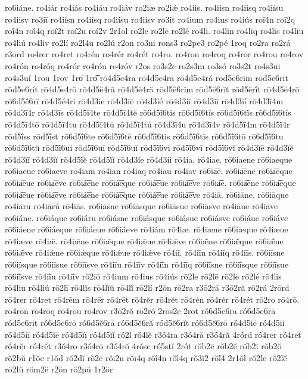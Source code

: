 {ro6iáne.
ro4iár
ro4iás
ro4iáu
ro4iáv
ro2iæ
ro2iǽ
ro4iis.
ro4iisn
ro4iisq
ro4iisu
ro4iisv
ro3iī
ro4iísn
ro4iísq
ro4iísu
ro4iísv
ro3it
ro4ium
ro4ius
ro4iús
roī4n
roī2q
roī́4n
roī́4q
roí2t
roí2u
roí2v
2r1ol
ro2le
ro2lē
ro2lé
ro4li.
ro4lin
ro4liq
ro4lis
ro4liu
ro4liú
ro4liv
ro2lí
ro2l4u
ro2lú
r2on
ro3ni
rons3
ro2pe3
ro2pé
1roq
ro2ra
ro2rá
r3ord
ro4rer
ro4ret
ro4rén
ro4rér
ro4rét
ro4ro.
ro4ron
ro4roq
ro4ror
ro4rou
ro4rov
ro4rón
ro4róq
ro4rór
ro4róu
ro4róv
r2os
ro3s2c
ro2s3m
ro3só
ro3s2t
ro4s3ui
ro4s3uí
1rou
1rov
1ro͞
1ro͡
rō4d5e4ra
rō4d5e4rā
rō4d5e4rá
rōd5e6rim
rōd5e6rit
rōd5e6rít
rō4d5e4rō
rō4d5ĕ4rā
rō4d5ĕ4ră
rōd5ĕ6rĭm
rōd5ĕ6rĭt
rōd5ĕrĭ́t
rō4d5ĕ4rō
rō6d5ĕ́6rĭ
rō4d5é4ri
rō4d3ie
rō4d3iē
rō4d3ié
rō4d3ii
rō4d3iī
rō4d3ií
rō4d3ī4m
rō4d3ī4r
rō4d3īs
rō4d5ī4te
rō4d5ī4tĕ
rō6d5ī6tis
rō6d5ī6tĭs
rō6d5ī6tĭ́s
rō6d5ī6tís
rō4d5ī4tō
rō4d5ī4tu
rō4d5ī4tŭ
rō4d5ī4tú
rō4d3ī4u
rō4d3ī4v
rō4d5ī́4m
rō4d5ī́4r
rōd5ī́ss
rōd5ī́st
rō6d5ī́6te
rō6d5ī́6tĕ
rō6d5ī́6tis
rō6d5ī́6tĭs
rō6d5ī́6tō
rō6d5ī́6tu
rō6d5ī́6tŭ
rōd5ī́6ui
rōd5ī́6uī
rōd5ī́6uĭ
rōd5ī́6vi
rōd5ī́6vī
rōd5ī́6vĭ
rō4d3ĭē
rō4d3ĭĕ
rō4d3ĭī
rō4d3ĭĭ
rō4d5ĭ́ĕ
rō4d5ĭ́ĭ
rō4d3íe
rō4d3íi
rō4ia.
rō4iae.
rō6iaene
rō6iaeque
rō6iaeue
rō6iaeve
rō4iam
rō4ian
rō4iaq
rō4iau
rō4iav
rō6ia͞e.
rō6ia͞ene
rō6ia͞eque
rō6ia͞eue
rō6ia͞eve
rō6iá͞ene
rō6iá͞eque
rō6iá͞eue
rō6iá͞eve
rō6ia͡e.
rō6ia͡ene
rō6ia͡eque
rō6ia͡eue
rō6ia͡eve
rō6iá͡ene
rō6iá͡eque
rō6iá͡eue
rō6iá͡eve
rō4iā.
rō6iāne.
rō6iāque
rō4iāru
rō4iārú
rō4iās.
rō6iāsne
rō6iāsque
rō6iāsue
rō6iāsve
rō4iāue
rō4iāve
rō6iā́ne.
rō6iā́que
rō6iā́ru
rō6iā́sne
rō6iā́sque
rō6iā́sue
rō6iā́sve
rō6iā́ue
rō6iā́ve
rō6iáene
rō6iáeque
rō6iáeue
rō6iáeve
rō4iám
rō4iæ.
rō4iæne
rō6iæque
rō4iæue
rō4iæve
rō4iǣ.
rō4iǣne
rō6iǣque
rō4iǣue
rō4iǣve
rō6iǣ́ne
rō6iǣ́que
rō6iǣ́ue
rō6iǣ́ve
rō4iǽne
rō6iǽque
rō4iǽue
rō4iǽve
rō4iī.
rō4iīn
rō4iīq
rō4iīs.
rō6iīsne
rō6iīsque
rō6iīsue
rō6iīsve
rō4iīu
rō4iīv
rō4iī́n
rō4iī́q
rō6iī́sne
rō6iī́sque
rō6iī́sue
rō6iī́sve
rō4iī́u
rō4iī́v
rō2iō
rō4ium
rō4ius
rō4iús
rō2le
rō2lē
rō2lĕ
rō2lé
rō4lis
rō4liu
rō4liú
rō2lī
rō4lĭs
rō4lĭŭ
rō4lĭ́
rō2lí
r2ōn
rō2ra
r3ō2rā
r3ō2ră
rō2rá
2rōrd
rō4rer
rō4ret
rō4rēm
rō4rēr
rō4rēt
rō4rĕr
rō4rĕt
rō4rén
rō4rér
rō4rét
rō2ro
rō4rō.
rō4rōn
rō4rōq
rō4rōu
rō4rōv
r3ō2rŏ
rō2ró
2rōs2c
2rōt
rṓ6d5e6ra
rṓ6d5e6rā
rṓd5e6rit
rṓ6d5e6rō
rṓ6d5ĕ6rā
rṓ6d5ĕ6ră
rṓd5ĕ6rĭt
rṓ6d5ĕ6rō
rṓ4d5iē
rṓ4d5ii
rṓ4d5iī
rṓ4d5ĭē
rṓ4d5ĭī
rṓ4d5ĭĭ
rṓ2l
rṓ4lĕ
r3ṓ4ra
r3ṓ4rā
r3ṓ4ră
4rṓrd
rṓ4rer
rṓ4ret
rṓ4rĕr
rṓ4rĕt
r3ṓ4ro
r3ṓ4rō
r3ṓ4rŏ
4rṓsc
rṓ5stĭ
2rṓt
rŏb2ē
rŏb2ĕ
rŏb2ī
rŏb2ŏ
rŏ2bŭ
r1ŏc
r1ŏd
rŏ2dĭ
rŏ2ē
rŏī2n
rŏī4q
rŏī́4n
rŏī́4q
rŏ3ĭ2
rŏĭ́4
2r1ŏl
rŏ2lē
rŏ2lĕ
rŏ2lŭ
rŏm2ĕ
r2ŏn
rŏ2pŭ
1r2ŏr
}
